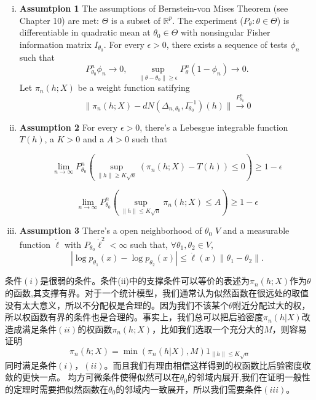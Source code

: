 \documentclass[review]{elsarticle}
\begin{document}
\begin{enumerate}[(i)]
    \item
        \textbf{Assumtpion 1} The assumptions of Bernstein-von Mises Theorem (see \cite{van2000asymptotic} Chapter 10) are met:  $\Theta$ is a subset of $\mathbb{R}^p$. The experiment ($P_{\theta}:\theta\in\Theta$) is differentiable in quadratic mean at $\theta_0\in \Theta$ with nonsingular Fisher information matrix $I_{\theta_0}$. For every $\epsilon>0$, there exists a sequence of tests $\phi_n$ such that
        \begin{equation}
            P_{\theta_0}^n\phi_n\to 0,\quad \sup_{\|\theta-\theta_0\|\geq \epsilon} P_\theta^n(1-\phi_n)\to 0.
        \end{equation}
        Let $\pi_n(h;X)$ be a weight function satifying 
        \begin{equation}
            \|\pi_n(h;X)-dN(\Delta_{n,\theta_0},I_{\theta_0}^{-1})(h)\|\overset{P_{\theta_0}^n}{\to}0
        \end{equation}
    \item
        
        

        \textbf{Assumption 2} For every $\epsilon>0$, there's a Lebesgue integrable function $T(h)$, a $K>0$ and a $A>0$ such that 

\begin{equation}
    \lim_{n\to \infty}P_{\theta_0}^n(\sup_{\|h\|\geq K\sqrt{n}}(\pi_n(h;X)-T(h))\leq 0)\geq 1-\epsilon
\end{equation}

        \begin{equation}
            \lim_{n\to \infty} P_{\theta_0}^n(\sup_{\|h\|\leq K\sqrt{n}} \pi_n(h;X)\leq A)\geq 1-\epsilon
        \end{equation}


    \item
        \textbf{Assumption 3}
        There's a open neighborhood of $\theta_0$ $V$ and a measurable function $\dot{\ell}$ with $P_{\theta_0}\dot{\ell}^2<\infty$ such that, $\forall \theta_1,\theta_2\in V$,
        \begin{equation}
            |\log p_{\theta_1}(x)-\log p_{\theta_2}(x)|\leq \dot{\ell}(x)\|\theta_1-\theta_2\|.
        \end{equation}
\end{enumerate}

条件$(i)$是很弱的条件。条件(ii)中的支撑条件可以等价的表述为$\pi_n(h;X)$作为$\theta$的函数,其支撑有界。对于一个统计模型，我们通常认为似然函数在很远处的取值没有太大意义，所以不分配权是合理的。因为我们不该某个$\theta$附近分配过大的权，所以权函数有界的条件也是合理的。事实上，我们总可以把后验密度$\pi_n(h|X)$改造成满足条件$(ii)$的权函数$\pi_n(h;X)$，比如我们选取一个充分大的$M$，则容易证明
\begin{equation}
    \pi_n(h;X)=\min(\pi_n(h|X),M) 1_{\|h\|\leq K\sqrt{n}}
\end{equation}
同时满足条件$(i)$，$(ii)$。而且我们有理由相信这样得到的权函数比后验密度收敛的更快一点。
均方可微条件使得似然可以在$\theta_0$的邻域内展开,我们在证明一般性的定理时需要把似然函数在$\theta_0$的邻域内一致展开，所以我们需要条件$(iii)$。
\end{document}
